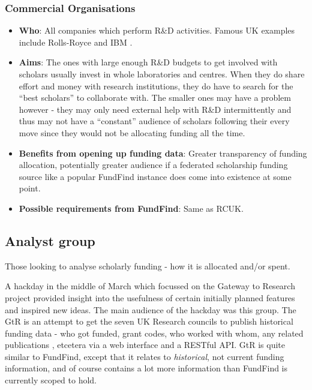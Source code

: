 \subsubsection{Commercial Organisations}

\begin{itemize}
 \item \textbf{Who}: All companies which perform R\&D activities. Famous UK examples include Rolls-Royce \cite{rolls-royce} and IBM \cite{ibm}.
 \item \textbf{Aims}: The ones with large enough R\&D budgets to get involved with scholars usually invest in whole laboratories and centres. When they do share effort and money with research institutions, they do have to search for the ``best scholars'' to collaborate with. The smaller ones may have a problem however - they may only need external help with R\&D intermittently and thus may not have a ``constant'' audience of scholars following their every move since they would not be allocating funding all the time.
 \item \textbf{Benefits from opening up funding data}: Greater transparency of funding allocation, potentially greater audience if a federated scholarship funding source like a popular FundFind instance does come into existence at some point.
 \item \textbf{Possible requirements from FundFind}: Same as RCUK.
\end{itemize}

\subsection{Analyst group}
\label{audience-analyst}
Those looking to analyse scholarly funding - how it is allocated and/or spent.

A hackday in the middle of March which focussed on the Gateway to Research project provided insight into the usefulness of certain initially planned features and inspired new ideas. The main audience of the hackday was this group. The GtR is an attempt to get the seven UK Research councils to publish historical funding data - who got funded, grant codes, who worked with whom, any related publications \cite{gtr}, etcetera via a web interface and a RESTful API. GtR is quite similar to FundFind, except that it relates to \emph{historical}, not current funding information, and of course contains a lot more information than FundFind is currently scoped to hold.

